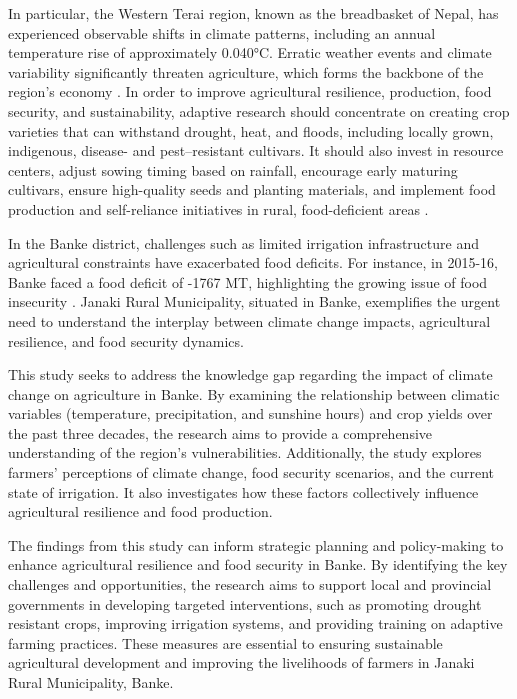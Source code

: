 In particular, the Western Terai region, known as the breadbasket of Nepal, has experienced observable shifts in climate patterns, including an annual temperature rise of approximately 0.040°C. Erratic weather events and climate variability significantly threaten agriculture, which forms the backbone of the region's economy \citep{factors_dahal_2021}.  In order to improve agricultural resilience, production, food security, and sustainability, adaptive research should concentrate on creating crop varieties that can withstand drought, heat, and floods, including locally grown, indigenous, disease- and pest--resistant cultivars. It should also invest in resource centers, adjust sowing timing based on rainfall, encourage early maturing cultivars, ensure high-quality seeds and planting materials, and implement food production and self-reliance initiatives in rural, food-deficient areas \citep{khanalFactorsMotivatingFarmers2021}.

In the Banke district, challenges such as limited irrigation infrastructure and agricultural constraints have exacerbated food deficits. For instance, in 2015-16, Banke faced a food deficit of -1767 MT, highlighting the growing issue of food insecurity \citep{gyawaliOverviewAgricultureNepal2021}. Janaki Rural Municipality, situated in Banke, exemplifies the urgent need to understand the interplay between climate change impacts, agricultural resilience, and food security dynamics. 

This study seeks to address the knowledge gap regarding the impact of climate change on agriculture in Banke. By examining the relationship between climatic variables (temperature, precipitation, and sunshine hours) and crop yields over the past three decades, the research aims to provide a comprehensive understanding of the region's vulnerabilities. Additionally, the study explores farmers' perceptions of climate change, food security scenarios, and the current state of irrigation. It also investigates how these factors collectively influence agricultural resilience and food production.

The findings from this study can inform strategic planning and policy-making to enhance agricultural resilience and food security in Banke. By identifying the key challenges and opportunities, the research aims to support local and provincial governments in developing targeted interventions, such as promoting drought resistant crops, improving irrigation systems, and providing training on adaptive farming practices. These measures are essential to ensuring sustainable agricultural development and improving the livelihoods of farmers in Janaki Rural Municipality, Banke.
